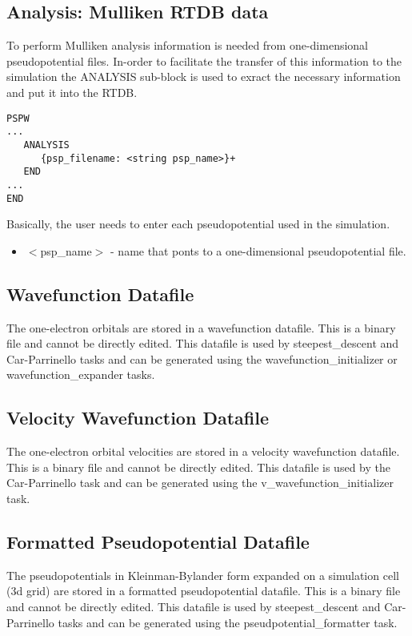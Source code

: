 \subsection{Analysis: Mulliken RTDB data}
\label{sec:pspw_analysis}

To perform Mulliken analysis information is needed from one-dimensional
pseudopotential files.  In-order to facilitate the transfer of this information
to the simulation the ANALYSIS sub-block is used to exract the necessary information
and put it into the RTDB.
\begin{verbatim}
PSPW
...
   ANALYSIS
      {psp_filename: <string psp_name>}+
   END
...
END
\end{verbatim}
Basically, the user needs to enter each pseudopotential used in the simulation.
\begin{itemize}
        \item $<$psp\_name$>$ - name that ponts to a one-dimensional pseudopotential file.
\end{itemize}


\subsection{Wavefunction Datafile}
The one-electron orbitals are stored in a wavefunction datafile.  This
is a binary file and cannot be directly edited.  This datafile is used
by steepest\_descent and Car-Parrinello tasks and can be generated
using the wavefunction\_initializer or wavefunction\_expander tasks.

\subsection{Velocity Wavefunction Datafile}
The one-electron orbital velocities are stored in a velocity wavefunction 
datafile.  This is a binary file and cannot be directly edited.  This datafile 
is used by the Car-Parrinello task and can be generated
using the v\_wavefunction\_initializer task.

\subsection{Formatted Pseudopotential Datafile}
The pseudopotentials in Kleinman-Bylander form expanded on a simulation
cell (3d grid) are stored in a formatted pseudopotential datafile.
This is a binary file and cannot be directly edited.
This datafile 
is used by steepest\_descent and Car-Parrinello tasks and can be generated
using the pseudpotential\_formatter task.

